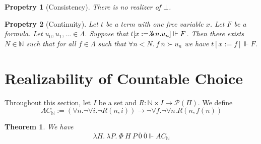 \documentclass{article}
\newcommand{\N}{\mathbb{N}}
\newcommand{\realizes}{\Vdash}
\newcommand{\oracle}[2]{\lambda\mkern-15mu\lambda\ #1. #2}
\newtheorem{theorem}{Theorem}
\newtheorem{property}{Propetry}
\begin{document}
\begin{property}[Consistency]
    There is no realizer of $\bot$.
\end{property}

\begin{property}[Continuity]
    Let $t$ be a term with one free variable $x$.
    Let $F$ be a formula.
    Let $u_0, u_1, \dots \in \Lambda$.
    Suppose that $t[x := \oracle{n}{u_n}] \realizes F$.
    Then there exists $N \in \N$ such that for all $f \in \Lambda$ such that $\forall n < N.\ f\ \overline{n} \succ u_n$ we have $t[x := f] \realizes F$.
\end{property}


\section{Realizability of Countable Choice}

Throughout this section, let $I$ be a set and $R: \N \times I \rightarrow \mathcal{P}(\Pi)$.
We define
\[AC_\N := (\forall n. \neg \forall i. \neg R(n, i)) \rightarrow \neg \forall f. \neg \forall n. R(n, f(n))\]

\begin{theorem} We have
    \[ \lambda H.\ \lambda P.\ \Phi\ H\ P\ \overline{0}\ \overline{0} \realizes AC_\N \]
\end{theorem}
\end{document}
